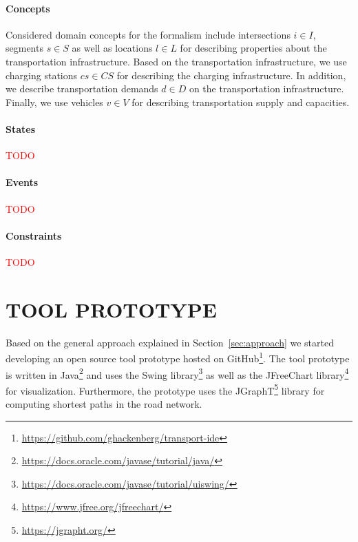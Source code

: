 \documentclass[a4paper,twoside]{article}
\begin{document}
	\paragraph{Concepts}
	
	Considered domain concepts for the formalism include intersections $i \in I$, segments $s \in S$ as well as locations $l \in L$ for describing properties about the transportation infrastructure.
	Based on the transportation infrastructure, we use charging stations $cs \in CS$ for describing the charging infrastructure. In addition, we describe transportation demands $d \in D$ on the transportation infrastructure.
	Finally, we use vehicles $v \in V$ for describing transportation supply and capacities.
	
	\paragraph{States}
	
	\textcolor{red}{TODO}
	
	\paragraph{Events}
	
	\textcolor{red}{TODO}
	
	\paragraph{Constraints}
	
	\textcolor{red}{TODO}
	
	\section{\uppercase{Tool prototype}}
	\label{sec:tool-prototype}
	
	Based on the general approach explained in Section~\ref{sec:approach} we started developing an open source tool prototype hosted on GitHub\footnote{\url{https://github.com/ghackenberg/transport-ide}}.
	The tool prototype is written in Java\footnote{\url{https://docs.oracle.com/javase/tutorial/java/}} and uses the Swing library\footnote{\url{https://docs.oracle.com/javase/tutorial/uiswing/}} as well as the JFreeChart library\footnote{\url{https://www.jfree.org/jfreechart/}} for visualization.
	Furthermore, the prototype uses the JGraphT\footnote{\url{https://jgrapht.org/}} library for computing shortest paths in the road network.
	
\end{document}
